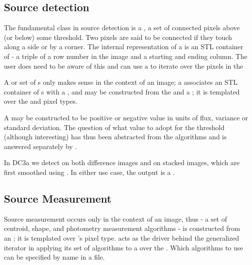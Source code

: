 \subsection{Source detection}

The fundamental class in source detection is a , a set of 
connected pixels above (or below) some threshold. Two pixels are said to be 
connected if they touch along a side or by a corner. The internal 
representation of a  is an STL container of  - 
a triple of a row number in the image and a starting and ending column. The 
user does need to be aware of this and can use a  to
iterate over the pixels in the 

A  or set of s only makes sense in the 
context of an image; a  associates an STL container of 
s with a , and may be constructed from 
the  and a ; it is templated over the 
 and  pixel types.

A  may be constructed to be positive or negative value in 
units of flux, variance or standard deviation. The question of what value to 
adopt for the threshold (although interesting) has thus been abstracted from 
the algorithms and is answered separately by . 

In DC3a we detect on both difference images and on stacked images, which are 
first smoothed using . In either use case, the output
is a .

\subsection{Source Measurement}

Source measurement occurs only in the context of an image, thus 
 - a set of centroid, shape, and photometry measurement 
algorithms - is constructed from an ; it is templated over 
's pixel type.   acts as the driver behind
the generalized  iterator  in applying 
its set of algorithms to a  over the . 
Which algorithms to use can be specified by name in a  file.


